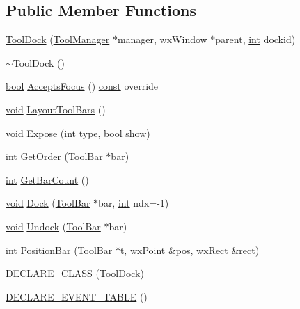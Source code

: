 \subsection*{Public Member Functions}
\begin{DoxyCompactItemize}
\item 
\hyperlink{class_tool_dock_af5b6669ae0a093fd855ba2f3860cc895}{Tool\+Dock} (\hyperlink{class_tool_manager}{Tool\+Manager} $\ast$manager, wx\+Window $\ast$parent, \hyperlink{xmltok_8h_a5a0d4a5641ce434f1d23533f2b2e6653}{int} dockid)
\item 
\hyperlink{class_tool_dock_a51d98d2758b790cdaddfb3672b94595e}{$\sim$\+Tool\+Dock} ()
\item 
\hyperlink{mac_2config_2i386_2lib-src_2libsoxr_2soxr-config_8h_abb452686968e48b67397da5f97445f5b}{bool} \hyperlink{class_tool_dock_a5e2af4bcf58e44bdbf5ed41767b2bf5d}{Accepts\+Focus} () \hyperlink{getopt1_8c_a2c212835823e3c54a8ab6d95c652660e}{const}  override
\item 
\hyperlink{sound_8c_ae35f5844602719cf66324f4de2a658b3}{void} \hyperlink{class_tool_dock_ad0ea588e4f5dd78808ad7563235651f0}{Layout\+Tool\+Bars} ()
\item 
\hyperlink{sound_8c_ae35f5844602719cf66324f4de2a658b3}{void} \hyperlink{class_tool_dock_ac063d797c816d7aa4e8d4d8fd18c3121}{Expose} (\hyperlink{xmltok_8h_a5a0d4a5641ce434f1d23533f2b2e6653}{int} type, \hyperlink{mac_2config_2i386_2lib-src_2libsoxr_2soxr-config_8h_abb452686968e48b67397da5f97445f5b}{bool} show)
\item 
\hyperlink{xmltok_8h_a5a0d4a5641ce434f1d23533f2b2e6653}{int} \hyperlink{class_tool_dock_a0b9743075598161a92c562f634012d2f}{Get\+Order} (\hyperlink{class_tool_bar}{Tool\+Bar} $\ast$bar)
\item 
\hyperlink{xmltok_8h_a5a0d4a5641ce434f1d23533f2b2e6653}{int} \hyperlink{class_tool_dock_aee1646fb86450d19b75301edfe937dd6}{Get\+Bar\+Count} ()
\item 
\hyperlink{sound_8c_ae35f5844602719cf66324f4de2a658b3}{void} \hyperlink{class_tool_dock_a18227f807600f2fc9227910a4255702e}{Dock} (\hyperlink{class_tool_bar}{Tool\+Bar} $\ast$bar, \hyperlink{xmltok_8h_a5a0d4a5641ce434f1d23533f2b2e6653}{int} ndx=-\/1)
\item 
\hyperlink{sound_8c_ae35f5844602719cf66324f4de2a658b3}{void} \hyperlink{class_tool_dock_a2aa01fab56dcc6791a4d1d6b4bf8ab08}{Undock} (\hyperlink{class_tool_bar}{Tool\+Bar} $\ast$bar)
\item 
\hyperlink{xmltok_8h_a5a0d4a5641ce434f1d23533f2b2e6653}{int} \hyperlink{class_tool_dock_afc46eaf261b5a0fffc4a8d61691b1f41}{Position\+Bar} (\hyperlink{class_tool_bar}{Tool\+Bar} $\ast$\hyperlink{octave__test_8m_aaccc9105df5383111407fd5b41255e23}{t}, wx\+Point \&pos, wx\+Rect \&rect)
\item 
\hyperlink{class_tool_dock_ad2aa7e33e4a8220907bb7168d7c13a48}{D\+E\+C\+L\+A\+R\+E\+\_\+\+C\+L\+A\+SS} (\hyperlink{class_tool_dock}{Tool\+Dock})
\item 
\hyperlink{class_tool_dock_a6ac18201a0763a01a81c6714e45011d0}{D\+E\+C\+L\+A\+R\+E\+\_\+\+E\+V\+E\+N\+T\+\_\+\+T\+A\+B\+LE} ()
\end{DoxyCompactItemize}
